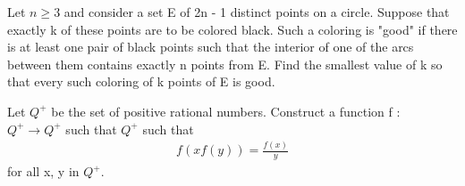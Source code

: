 \item Let $n \geq 3$ and consider a set E of 2n - 1 distinct points on a circle. Suppose that exactly k of these points are to be colored black. Such a coloring is "good" if there is at least one pair of black points such that the interior of one of the arcs between them contains exactly n points from E. Find the smallest value of k so that every such coloring of k points of E is good.

\item Let $Q^{+}$ be the set of positive rational numbers. Construct a function f : $Q^{+} \rightarrow Q^{+}$ such that  $Q^{+}$ such that
\begin{align*}
f(xf(y)) = \frac{f(x)}{y}
\end{align*}
for all x, y in $Q^{+}$.






